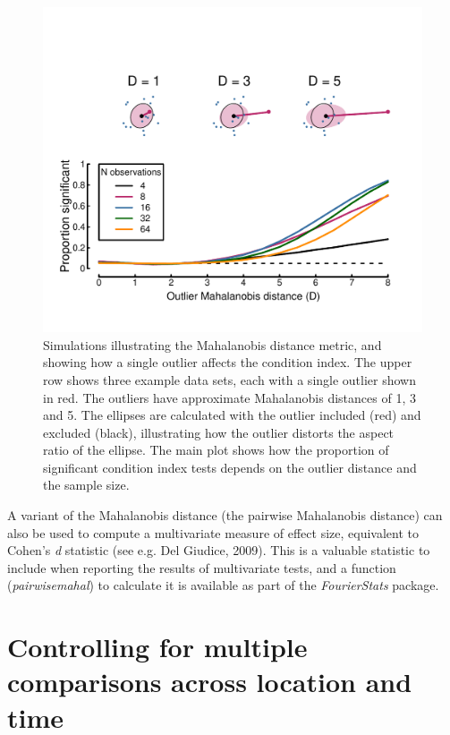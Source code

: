 \documentclass[]{article}
\begin{document}
\begin{figure}

{\centering \includegraphics{figures/outlierplot} 

}

\caption{Simulations illustrating the Mahalanobis distance metric, and showing how a single outlier affects the condition index. The upper row shows three example data sets, each with a single outlier shown in red. The outliers have approximate Mahalanobis distances of 1, 3 and 5. The ellipses are calculated with the outlier included (red) and excluded (black), illustrating how the outlier distorts the aspect ratio of the ellipse. The main plot shows how the proportion of significant condition index tests depends on the outlier distance and the sample size.}\label{fig:outlierplot}
\end{figure}

A variant of the Mahalanobis distance (the pairwise Mahalanobis distance) can also be used to compute a multivariate measure of effect size, equivalent to Cohen's \emph{d} statistic (see e.g. Del Giudice, 2009). This is a valuable statistic to include when reporting the results of multivariate tests, and a function (\emph{pairwisemahal}) to calculate it is available as part of the \emph{FourierStats} package.

\hypertarget{controlling-for-multiple-comparisons-across-location-and-time}{%
\section{Controlling for multiple comparisons across location and time}\label{controlling-for-multiple-comparisons-across-location-and-time}}
\end{document}
